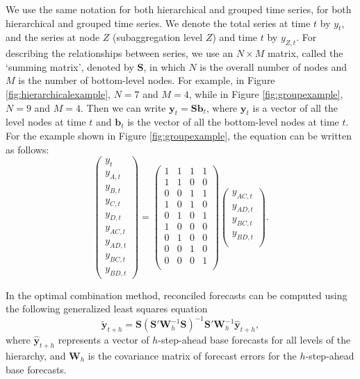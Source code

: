 \documentclass[11pt,a4paper,]{article}
\begin{document}
We use the same notation for both hierarchical and grouped time series, \autocite[following][]{fpp2} for both hierarchical and grouped time series. We denote the total series at time \(t\) by \(y_t\), and the series at node \(Z\) (subaggregation level \(Z\)) and time \(t\) by \(y_{Z,t}\). For describing the relationships between series, we use an \(N\times M\) matrix, called the `summing matrix', denoted by \(\bm{S}\), in which \(N\) is the overall number of nodes and \(M\) is the number of bottom-level nodes. For example, in Figure \ref{fig:hierarchicalexample}, \(N = 7\) and \(M = 4\), while in Figure \ref{fig:groupexample}, \(N=9\) and \(M=4\). Then we can write \(\bm{y}_t=\bm{S}\bm{b}_t\), where \(\bm{y}_t\) is a vector of all the level nodes at time \(t\) and \(\bm{b}_t\) is the vector of all the bottom-level nodes at time \(t\). For the example shown in Figure \ref{fig:groupexample}, the equation can be written as follows:
\begin{equation}\label{eq:Smatrixexample}
  \begin{pmatrix}
    y_{t}\\y_{A,t}\\y_{B,t}\\y_{C,t}\\y_{D,t}\\y_{AC,t}\\y_{AD,t}\\y_{BC,t}\\y_{BD,t}
  \end{pmatrix} =
  \begin{pmatrix}
    1&1&1&1\\1&1&0&0\\0&0&1&1\\1&0&1&0\\0&1&0&1\\1&0&0&0\\0&1&0&0\\0&0&1&0\\0&0&0&1\\
  \end{pmatrix}
  \begin{pmatrix}
    y_{AC,t}\\y_{AD,t}\\y_{BC,t}\\y_{BD,t}\\
  \end{pmatrix}.
\end{equation}

In the optimal combination method, reconciled forecasts can be computed using the following generalized least squares equation \autocite{mint2018}
\begin{equation}\label{eq:mint}
  \tilde{\bm{y}}_{t+h}=\bm{S}(\bm{S}'\bm{W}_{h}^{-1}\bm{S})^{-1}\bm{S}'\bm{W}_{h}^{-1}\hat{\bm{y}}_{t+h},
\end{equation}
where \(\hat{\bm{y}}_{t+h}\) represents a vector of \(h\)-step-ahead base forecasts for all levels of the hierarchy, and \(\bm{W}_{h}\) is the covariance matrix of forecast errors for the \(h\)-step-ahead base forecasts.
\end{document}
